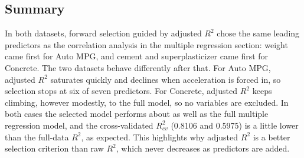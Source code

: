 \subsection{Summary}

In both datasets, forward selection guided by adjusted $R^2$ chose the same leading predictors as the correlation analysis in the multiple regression section: weight came first for Auto MPG, and cement and superplasticizer came first for Concrete. The two datasets behave differently after that. For Auto MPG, adjusted $R^2$ saturates quickly and declines when acceleration is forced in, so selection stops at six of seven predictors. For Concrete, adjusted $R^2$ keeps climbing, however modestly, to the full model, so no variables are excluded. In both cases the selected model performs about as well as the full multiple regression model, and the cross-validated $R^2_{cv}$ (0.8106 and 0.5975) is a little lower than the full-data $R^2$, as expected. This highlights why adjusted $R^2$ is a better selection criterion than raw $R^2$, which never decreases as predictors are added.
